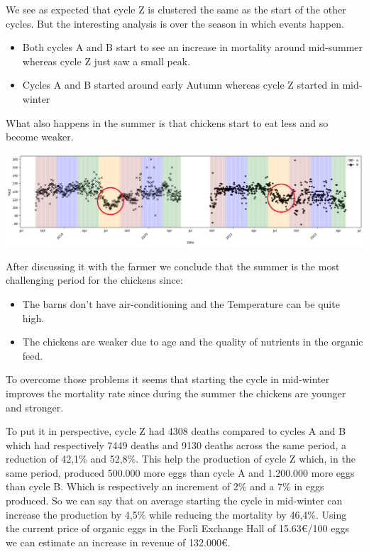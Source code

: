 \documentclass[11pt]{article}
\begin{document}
We see as expected that cycle Z is clustered the same as the start of the other cycles. But the interesting analysis is over the season in which events happen.

\begin{itemize}
    \item Both cycles A and B start to see an increase in mortality around mid-summer whereas cycle Z just saw a small peak.
    \item Cycles A and B started around early Autumn whereas cycle Z started in mid-winter
\end{itemize}

What also happens in the summer is that chickens start to eat less and so become weaker.

\includegraphics[width=\linewidth]{../Results/Comparison_Z_AB/feed_plot.png}

After discussing it with the farmer we conclude that the summer is the most challenging period for the chickens since:
\begin{itemize}
    \item The barns don't have air-conditioning and the Temperature can be quite high.
    \item The chickens are weaker due to age and the quality of nutrients in the organic feed.
\end{itemize}

To overcome those problems it seems that starting the cycle in mid-winter improves the mortality rate since during the summer the chickens are younger and stronger.

To put it in perspective, cycle Z had 4308 deaths compared to cycles A and B which had respectively 7449 deaths and 9130 deaths across the same period, a reduction of 42,1\% and 52,8\%.
This help the production of cycle Z which, in the same period, produced 500.000 more eggs than cycle A and 1.200.000 more eggs than cycle B. Which is respectively an increment of 2\% and a 7\% in eggs produced.
So we can say that on average starting the cycle in mid-winter can increase the production by 4,5\% while reducing the mortality by 46,4\%.
Using the current price of organic eggs in the Forlì Exchange Hall of 15.63\euro/100 eggs we can estimate an increase in revenue of 132.000\euro.
\end{document}
